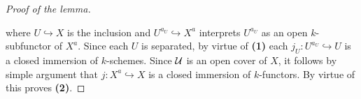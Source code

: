 \begin{proof}[Proof of the lemma]
\begin{center}
\end{center}
where $U\hookrightarrow X$ is the inclusion and $U^{a_U} \hookrightarrow X^a$ interprets $U^{a_U}$ as an open $k$-subfunctor of $X^a$. Since each $U$ is separated, by virtue of \textbf{(1)} each $j_U:U^{a_U} \hookrightarrow U$ is a closed immersion of $k$-schemes. Since ${\mathcal U}$ is an open cover of $X$, it follows by simple argument that $j:X^a \hookrightarrow X$ is a closed immersion of $k$-functors. By virtue of {\cite[Proposition 5.9]{kfunctors}} this proves \textbf{(2)}.
\end{proof}

